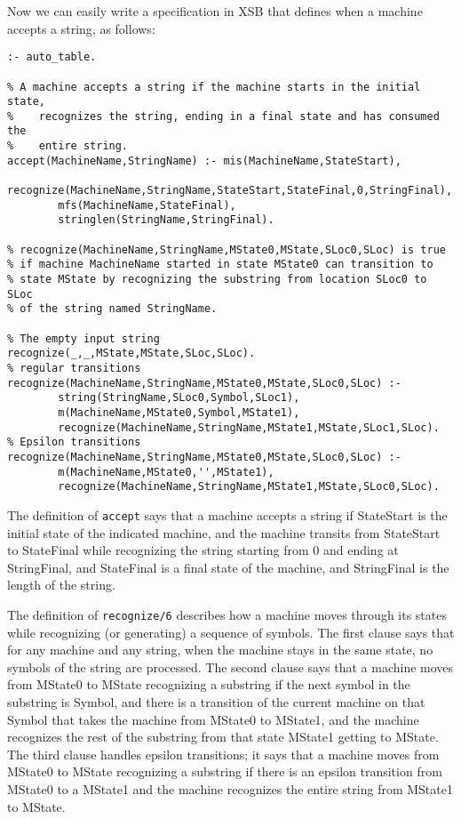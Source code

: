 Now we can easily write a specification in XSB that defines when a
machine accepts a string, as follows:
\begin{verbatim}
:- auto_table.

% A machine accepts a string if the machine starts in the initial state,
%    recognizes the string, ending in a final state and has consumed the
%    entire string.
accept(MachineName,StringName) :- mis(MachineName,StateStart),
        recognize(MachineName,StringName,StateStart,StateFinal,0,StringFinal),
        mfs(MachineName,StateFinal),
        stringlen(StringName,StringFinal).

% recognize(MachineName,StringName,MState0,MState,SLoc0,SLoc) is true
% if machine MachineName started in state MState0 can transition to
% state MState by recognizing the substring from location SLoc0 to SLoc
% of the string named StringName.

% The empty input string
recognize(_,_,MState,MState,SLoc,SLoc).
% regular transitions
recognize(MachineName,StringName,MState0,MState,SLoc0,SLoc) :-
        string(StringName,SLoc0,Symbol,SLoc1),
        m(MachineName,MState0,Symbol,MState1),
        recognize(MachineName,StringName,MState1,MState,SLoc1,SLoc).
% Epsilon transitions
recognize(MachineName,StringName,MState0,MState,SLoc0,SLoc) :-
        m(MachineName,MState0,'',MState1),
        recognize(MachineName,StringName,MState1,MState,SLoc0,SLoc).
\end{verbatim}

The definition of \verb|accept| says that a machine accepts a string
if StateStart is the initial state of the indicated machine, and the
machine transits from StateStart to StateFinal while recognizing the
string starting from 0 and ending at StringFinal, and StateFinal is a
final state of the machine, and StringFinal is the length of the
string.

The definition of \verb|recognize/6| describes how a machine moves
through its states while recognizing (or generating) a sequence of
symbols.  The first clause says that for any machine and any string,
when the machine stays in the same state, no symbols of the string are
processed.  The second clause says that a machine moves from MState0
to MState recognizing a substring if the next symbol in the substring
is Symbol, and there is a transition of the current machine on that
Symbol that takes the machine from MState0 to MState1, and the machine
recognizes the rest of the substring from that state MState1 getting
to MState.  The third clause handles epsilon transitions; it says that
a machine moves from MState0 to MState recognizing a substring if
there is an epsilon transition from MState0 to a MState1 and the
machine recognizes the entire string from MState1 to MState.

